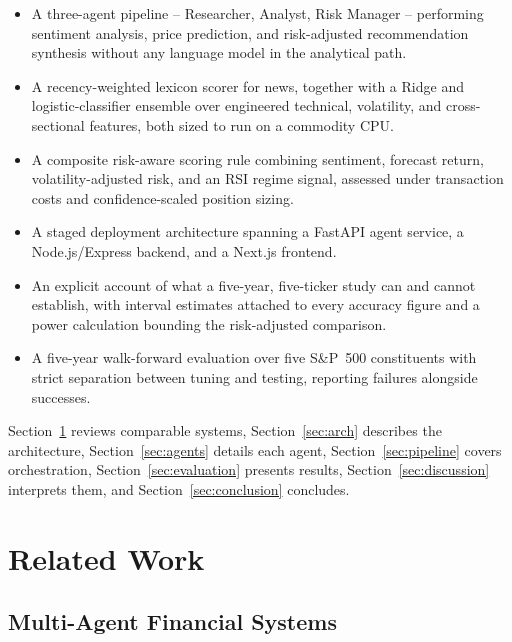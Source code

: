 \documentclass[conference]{IEEEtran}
\begin{document}
\begin{itemize}
\item A three-agent pipeline -- Researcher, Analyst, Risk Manager -- performing sentiment analysis, price prediction, and risk-adjusted recommendation synthesis without any language model in the analytical path.
\item A recency-weighted lexicon scorer for news, together with a Ridge and logistic-classifier ensemble over engineered technical, volatility, and cross-sectional features, both sized to run on a commodity CPU.
\item A composite risk-aware scoring rule combining sentiment, forecast return, volatility-adjusted risk, and an RSI regime signal, assessed under transaction costs and confidence-scaled position sizing.
\item A staged deployment architecture spanning a FastAPI agent service, a Node.js/Express backend, and a Next.js frontend.
\item An explicit account of what a five-year, five-ticker study can and cannot establish, with interval estimates attached to every accuracy figure and a power calculation bounding the risk-adjusted comparison.
\item A five-year walk-forward evaluation over five S\&P~500 constituents with strict separation between tuning and testing, reporting failures alongside successes.
\end{itemize}

Section~\ref{sec:related} reviews comparable systems, Section~\ref{sec:arch} describes the architecture, Section~\ref{sec:agents} details each agent, Section~\ref{sec:pipeline} covers orchestration, Section~\ref{sec:evaluation} presents results, Section~\ref{sec:discussion} interprets them, and Section~\ref{sec:conclusion} concludes.

\section{Related Work}
\label{sec:related}

\subsection{Multi-Agent Financial Systems}
\end{document}
